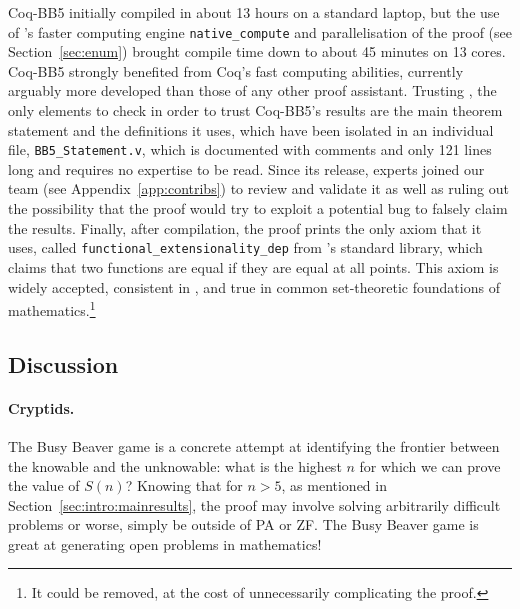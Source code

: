 \documentclass[a4paper,british]{article}
\theoremstyle{definition} %
\numberwithin{equation}{section}
\theoremstyle{definition} %
\newcommand{\CoqBB}{Coq-BB5\xspace}
\begin{document}



\enlargethispage{\baselineskip}
\CoqBB initially compiled in about 13 hours on a standard laptop, but the use of \Coq's faster computing engine \texttt{native\_compute} \cite{nativecompute} and parallelisation of the proof (see Section~\ref{sec:enum}) brought compile time down to about 45 minutes on 13 cores. \CoqBB strongly benefited from Coq’s fast computing abilities, currently arguably more developed than those of any other proof assistant. Trusting \Coq, the only elements to check in order to trust \CoqBB's results are the main theorem statement and the definitions it uses, which have been isolated in an individual file, \texttt{BB5\_Statement.v}, which is documented with comments and only 121 lines long and requires no \Coq expertise to be read. Since its release, \Coq experts joined our team (see Appendix~\ref{app:contribs}) to review and validate it as well as ruling out the possibility that the proof would try to exploit a potential \Coq bug to falsely claim the results. Finally, after compilation, the proof prints the only axiom that it uses, called \texttt{functional\_extensionality\_dep} from \Coq's standard library, which claims that two functions are equal if they are equal at all points. This axiom is widely accepted, consistent in \Coq, and true in common set-theoretic foundations of mathematics.\footnote{It could be removed, at the cost of unnecessarily complicating the proof.}


\subsection{Discussion}\label{sec:intro:discuss}

\paragraph{Cryptids.} The Busy Beaver game is a concrete attempt at identifying the frontier between the knowable and the unknowable: what is the highest $n$ for which we can prove the value of $S(n)$? Knowing that for $n > 5$, as mentioned in Section~\ref{sec:intro:mainresults}, the proof may involve solving arbitrarily difficult problems or worse, simply be outside of PA or ZF. The Busy Beaver game is great at generating open problems in mathematics!
\end{document}
